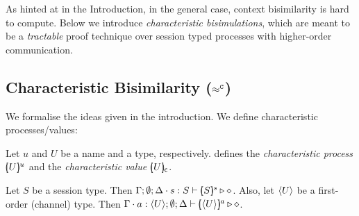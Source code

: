 \documentclass[a4paper,UKenglish]{lipics}
\theoremstyle{definition}
\begin{document}
\noi As hinted at in %
the Introduction,
in the general case,
context bisimilarity 
is hard to compute. Below we introduce 
\emph{characteristic bisimulations}, which are meant to be a \emph{tractable} proof technique over session typed  processes with higher-order communication.

\subsection{%
Characteristic  Bisimilarity ($\approx^\mathtt{C}$)}\label{ss:hwb}
\noi 
We formalise the ideas given in %
the introduction.
We define characteristic processes/values:

\begin{definition}\rm
\label{def:char}
	Let $u$ and $U$ be a name and a type, respectively.
	 defines the {\em characteristic process} 
	$[\!\!(U)\!\!]^{u}$ and the {\em characteristic value} $[\!\!(U)\!\!]_{\mathsf{c}}$.
\end{definition}

\begin{proposition}%
		Let $S$ be a session type. Then $\Gamma; \emptyset; \Delta \cdot s: S \vdash [\!\!(S)\!\!]^{s} \triangleright \diamond$.
		Also, let $\langle U \rangle$ be a first-order (channel) type. Then $\Gamma \cdot a: \langle U \rangle; \emptyset; \Delta \vdash [\!\!(\langle U \rangle)\!\!]^{a} \triangleright \diamond$.
\end{proposition}
\end{document}
